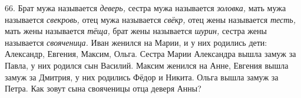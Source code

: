 66.  Брат мужа называется {\it деверь,} сестра мужа называется {\it золовка,} мать мужа называется {\it свекровь,} отец мужа называется {\it свёкр,} отец жены называется {\it тесть,} мать жены называется {\it тёща,} брат жены называется {\it шурин,} сестра жены называется {\it свояченица.} Иван женился на Марии, и у них родились дети: Александр, Евгения, Максим, Ольга. Сестра Марии Александра вышла замуж за Павла, у них родился сын Василий. Максим женился на Анне, Евгения вышла замуж за Дмитрия, у них родились Фёдор и Никита. Ольга вышла замуж за Петра. Как зовут сына свояченицы отца деверя Анны?\\
